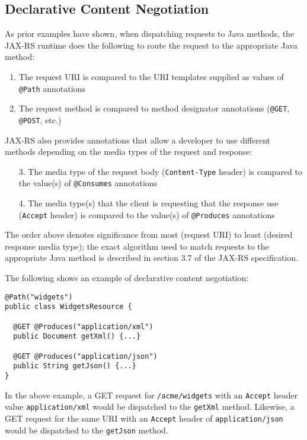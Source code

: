 \documentclass{acm_proc_article-sp}
\begin{document}
\subsection{Declarative Content Negotiation}

As prior examples have shown, when dispatching requests to Java methods, the JAX-RS runtime does the following to route the request to the appropriate Java method: 

\begin{enumerate}
\item The request URI is compared to the URI templates supplied as values of \texttt{@Path} annotations
\item The request method is compared to method designator annotations (\texttt{@GET}, \texttt{@POST}, etc.)
\end{enumerate}

JAX-RS also provides annotations that allow a developer to use different methods depending on the media types of the request and response:

\begin{enumerate}
\item[3.] The media type of the request body (\texttt{Content-Type} header) is compared to the value(s) of \texttt{@Consumes} annotations
\item[4.] The media type(s) that the client is requesting that the response use (\texttt{Accept} header) is compared to the value(s) of \texttt{@Produces} annotations
\end{enumerate}

The order above denotes significance from most (request URI) to least (desired response media type); the exact algorithm used to match requests to the appropriate Java method is described in section 3.7 of the JAX-RS specification\cite{jaxrs11}.

The following shows an example of declarative content negotiation:

\begin{verbatim}
@Path("widgets")
public class WidgetsResource {

  @GET @Produces("application/xml")
  public Document getXml() {...}
  
  @GET @Produces("application/json")
  public String getJson() {...}
}
\end{verbatim}

In the above example, a GET request for \texttt{/acme/widgets} with an \texttt{Accept} header value \texttt{application/xml} would be dispatched to the \texttt{getXml} method. Likewise, a GET request for the same URI with an \texttt{Accept} header of \texttt{application/json} would be dispatched to the \texttt{getJson} method. 
\end{document}
